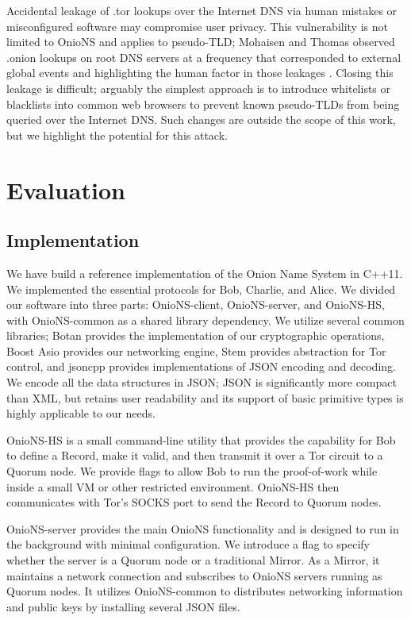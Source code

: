 \documentclass[conference]{IEEEtran}
\begin{document}
Accidental leakage of .tor lookups over the Internet DNS via human mistakes or misconfigured software may compromise user privacy. This vulnerability is not limited to OnioNS and applies to pseudo-TLD; Mohaisen and Thomas observed .onion lookups on root DNS servers at a frequency that corresponded to external global events and highlighting the human factor in those leakages \cite{thomasmeasuring}. Closing this leakage is difficult; arguably the simplest approach is to introduce whitelists or blacklists into common web browsers to prevent known pseudo-TLDs from being queried over the Internet DNS. Such changes are outside the scope of this work, but we highlight the potential for this attack.

\section{Evaluation}
\label{sec:eval}

\subsection{Implementation}

We have build a reference implementation of the Onion Name System in C++11. We implemented the essential protocols for Bob, Charlie, and Alice. We divided our software into three parts: OnioNS-client, OnioNS-server, and OnioNS-HS, with OnioNS-common as a shared library dependency. We utilize several common libraries; Botan \cite{BotanLib} provides the implementation of our cryptographic operations, Boost Asio \cite{AsioLib} provides our networking engine, Stem provides abstraction for Tor control, and jsoncpp \cite{JsonCppLib} provides implementations of JSON encoding and decoding. We encode all the data structures in JSON; JSON is significantly more compact than XML, but retains user readability and its support of basic primitive types is highly applicable to our needs. 

OnioNS-HS is a small command-line utility that provides the capability for Bob to define a Record, make it valid, and then transmit it over a Tor circuit to a Quorum node. We provide flags to allow Bob to run the proof-of-work while inside a small VM or other restricted environment. OnioNS-HS then communicates with Tor's SOCKS port to send the Record to Quorum nodes.

OnioNS-server provides the main OnioNS functionality and is designed to run in the background with minimal configuration. We introduce a flag to specify whether the server is a Quorum node or a traditional Mirror. As a Mirror, it maintains a network connection and subscribes to OnioNS servers running as Quorum nodes. It utilizes OnioNS-common to distributes networking information and public keys by installing several JSON files.
\end{document}
